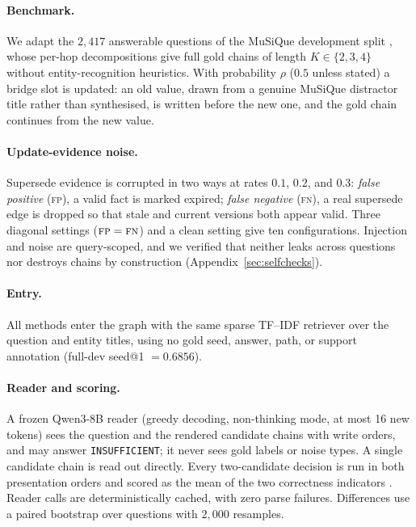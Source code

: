 \documentclass[11pt]{article}
\begin{document}
\paragraph{Benchmark.}
We adapt the $2{,}417$ answerable questions of the MuSiQue development split
\citep{trivedi2022musique}, whose per-hop decompositions give full gold chains of length
$K\in\{2,3,4\}$ without entity-recognition heuristics. With probability $\rho$ ($0.5$ unless stated)
a bridge slot is updated: an old value, drawn from a genuine MuSiQue distractor title rather than
synthesised, is written before the new one, and the gold chain continues from the new value.

\paragraph{Update-evidence noise.}
Supersede evidence is corrupted in two ways at rates $0.1$, $0.2$, and $0.3$: \emph{false positive}
(\textsc{fp}), a valid fact is marked expired; \emph{false negative} (\textsc{fn}), a real supersede
edge is dropped so that stale and current versions both appear valid. Three diagonal settings
($\textsc{fp}=\textsc{fn}$) and a clean setting give ten configurations. Injection and noise are
query-scoped, and we verified that neither leaks across questions nor destroys chains by construction
(Appendix~\ref{sec:selfchecks}).

\paragraph{Entry.}
All methods enter the graph with the same sparse TF--IDF retriever over the question and entity
titles, using no gold seed, answer, path, or support annotation (full-dev seed@1 $=0.6856$).

\paragraph{Reader and scoring.}
A frozen Qwen3-8B reader (greedy decoding, non-thinking mode, at most 16 new tokens) sees the question
and the rendered candidate chains with write orders, and may answer \texttt{INSUFFICIENT}; it never
sees gold labels or noise types. A single candidate chain is read out directly. Every two-candidate
decision is run in both presentation orders and scored as the mean of the two correctness indicators
\citep{wang2024fair,zheng2023judge}. Reader calls are deterministically cached, with zero parse
failures. Differences use a paired bootstrap over questions with $2{,}000$ resamples.
\end{document}
